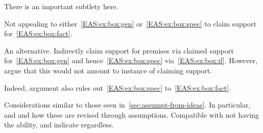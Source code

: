 \begin{note}
  There is an important subtlety here.
  {
    \color{red}
    Not appealing to either~\ref{EAS:ex:box:gen} or~\ref{EAS:ex:box:spec} to claim support for~\ref{EAS:ex:box:fact}.

    An alternative.
    Indirectly claim support for premises via claimed support for~\ref{EAS:ex:box:gen} and hence~\ref{EAS:ex:box:spec} via~\ref{EAS:ex:box:if}.
    However, argue that this would not amount to instance of claiming support.

    Indeed, argument also rules out~\ref{EAS:ex:box:spec} to~\ref{EAS:ex:box:fact}.

    Considerations similar to those seen in~\autoref{sec:assumpt-from-ideas}.
    In particular, \ideaCSA{} and \ideaCSB{} and how these are revised through assumptions.
    Compatible with not having the ability, and indicate regardless.
  }
\end{note}

